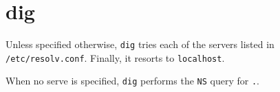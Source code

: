 \section{dig}
\label{sec:dig}

\newcommand{\d}{\texttt{dig}}

Unless specified otherwise, \d{} tries each of the servers listed in
\texttt{/etc/resolv.conf}. Finally, it resorts to \texttt{localhost}.

When no serve is specified, \d{} performs the \texttt{NS} query for \texttt{.}.